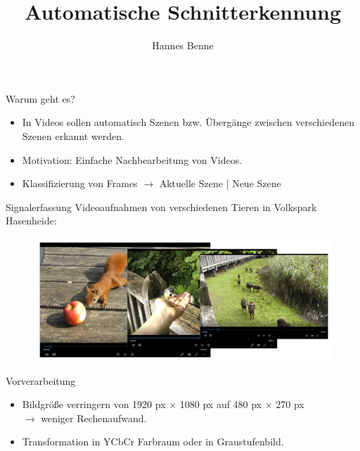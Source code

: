 \documentclass[11pt]{beamer}
\author{Hannes Benne}
\title{Automatische Schnitterkennung}
\begin{document}
\begin{frame}
\titlepage
\end{frame}


\begin{frame}{Warum geht es?}
\begin{itemize}
\item In Videos sollen automatisch Szenen bzw. Übergänge zwischen verschiedenen Szenen erkannt werden.
\item Motivation: Einfache Nachbearbeitung von Videos.
\item Klassifizierung von Frames $\rightarrow$ Aktuelle Szene | Neue Szene
\end{itemize}
\end{frame}

\begin{frame}[t]{Signalerfassung}
Videoaufnahmen von verschiedenen Tieren in Volkspark Hasenheide:
\begin{figure}
	\centering
	\includegraphics[scale=0.15]{Signalerfassung}
\end{figure}
\end{frame}

\begin{frame}{Vorverarbeitung}
\begin{itemize}
\item Bildgröße verringern von 1920 px $\times$ 1080 px auf 480 px $\times$ 270 px  \\
$\rightarrow$ weniger Rechenaufwand. 
\item Transformation in YCbCr Farbraum oder in Graustufenbild. 
\end{itemize} 
~\newline
~\newline
\end{frame}
\end{document}
